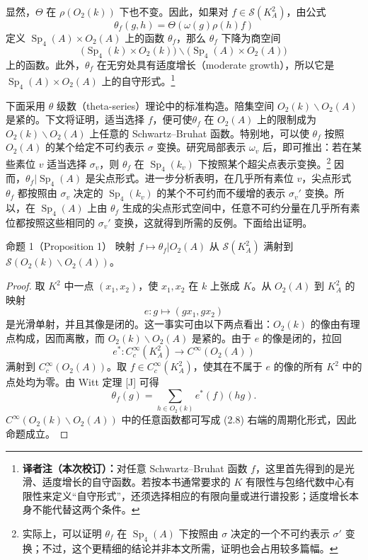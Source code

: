 显然，$\Theta$ 在 $\rho(O_2(k))$ 下也不变。因此，如果对 $f\in\mathcal S(K_A^2)$，由公式
\begin{equation}
 \theta_f(g,h)=\Theta(\omega(g)\rho(h)f)\tag{2.7}
\end{equation}
定义 $\operatorname{Sp}_4(A)\times O_2(A)$ 上的函数 $\theta_f$，那么 $\theta_f$ 下降为商空间
\[
 \bigl(\operatorname{Sp}_4(k)\times O_2(k)\bigr)
 \backslash\bigl(\operatorname{Sp}_4(A)\times O_2(A)\bigr)
\]
上的函数。此外，$\theta_f$ 在无穷处具有适度增长（moderate growth），所以它是 $\operatorname{Sp}_4(A)\times O_2(A)$ 上的自守形式。\footnote{\textbf{译者注（本次校订）：}对任意 Schwartz--Bruhat 函数 $f$，这里首先得到的是光滑、适度增长的自守函数。若按本书通常要求的 $K$ 有限性与包络代数中心有限性来定义“自守形式”，还须选择相应的有限向量或进行谱投影；适度增长本身不能代替这两个条件。}

下面采用 $\theta$ 级数（theta-series）理论中的标准构造。陪集空间 $O_2(k)\backslash O_2(A)$ 是紧的。下文将证明，适当选择 $f$，便可使$\theta_f$ 在 $O_2(A)$ 上的限制成为 $O_2(k)\backslash O_2(A)$ 上任意的 Schwartz--Bruhat 函数。特别地，可以使 $\theta_f$ 按照 $O_2(A)$ 的某个给定不可约表示 $\sigma$ 变换。研究局部表示 $\omega_v$ 后，即可推出：若在某些素位 $v$ 适当选择 $\sigma_v$，则 $\theta_f$ 在 $\operatorname{Sp}_4(k_v)$ 下按照某个超尖点表示变换。\footnote{实际上，可以证明 $\theta_f$ 在 $\operatorname{Sp}_4(A)$ 下按照由 $\sigma$ 决定的一个不可约表示 $\sigma'$ 变换；不过，这个更精细的结论并非本文所需，证明也会占用较多篇幅。} 因而，$\theta_f|\operatorname{Sp}_4(A)$ 是尖点形式。进一步分析表明，在几乎所有素位 $v$，尖点形式 $\theta_f$ 都按照由 $\sigma_v$ 决定的 $\operatorname{Sp}_4(k_v)$ 的某个不可约而不缓增的表示 $\sigma_v'$ 变换。所以，在 $\operatorname{Sp}_4(A)$ 上由 $\theta_f$ 生成的尖点形式空间中，任意不可约分量在几乎所有素位都按照这些相同的 $\sigma_v'$ 变换，这就得到所需的反例。下面给出证明。

\begin{originaltheorem}{命题 1（Proposition 1）}
映射 $f\mapsto\theta_f|O_2(A)$ 从 $\mathcal S(K_A^2)$ 满射到 $\mathcal S(O_2(k)\backslash O_2(A))$。
\end{originaltheorem}
\begin{proof}
取 $K^2$ 中一点 $(x_1,x_2)$，使 $x_1,x_2$ 在 $k$ 上张成 $K$。从 $O_2(A)$ 到 $K_A^2$ 的映射
\[
 e:g\longmapsto(gx_1,gx_2)
\]
是光滑单射，并且其像是闭的。这一事实可由以下两点看出：$O_2(k)$ 的像由有理点构成，因而离散，而 $O_2(k)\backslash O_2(A)$ 是紧的。由于 $e$ 的像是闭的，拉回
\[
 e^*:C_c^\infty(K_A^2)\longrightarrow C^\infty(O_2(A))
\]
满射到 $C_c^\infty(O_2(A))$。取 $f\in C_c^\infty(K_A^2)$，使其在不属于 $e$ 的像的所有 $K^2$ 中的点处均为零。由 Witt 定理 [J] 可得
\begin{equation}
 \theta_f(g)=\sum_{h\in O_2(k)}e^*(f)(hg).\tag{2.8}
\end{equation}
$C^\infty(O_2(k)\backslash O_2(A))$ 中的任意函数都可写成 (2.8) 右端的周期化形式，因此命题成立。
\end{proof}

